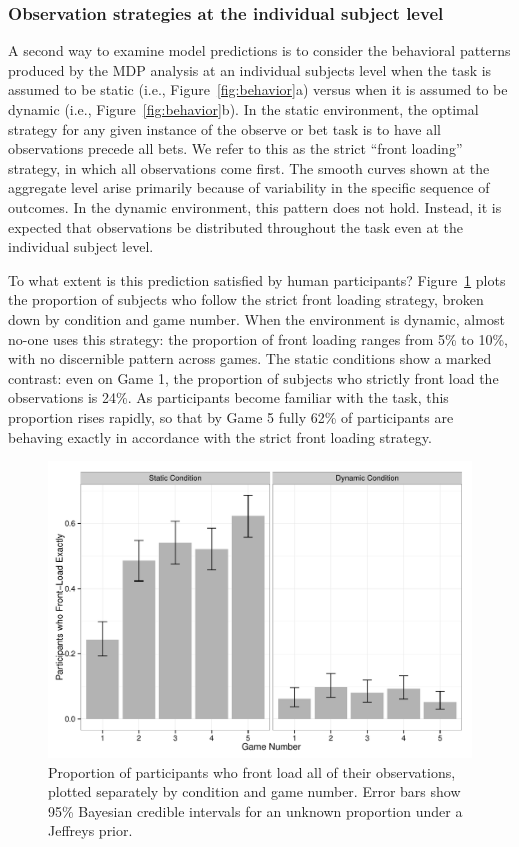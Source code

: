 \documentclass[authoryear]{elsarticle}
\newcommand{\subsubsectionX}[1]{\subsubsection{#1}}
\begin{document}
\subsubsectionX{Observation strategies at the individual subject level}


A second way to examine model predictions is to consider the behavioral patterns produced by the MDP analysis at an individual subjects level when the task is assumed to be static (i.e., Figure~\ref{fig:behavior}a) versus when it is assumed to be dynamic (i.e., Figure~\ref{fig:behavior}b). In the static environment, the optimal strategy for any given instance of the observe or bet task is to have all observations precede all bets. We refer to this as the strict ``front loading'' strategy, in which all observations come first. The smooth curves shown at the aggregate level arise primarily because of variability in the specific sequence of outcomes. In the dynamic environment, this pattern does not hold. Instead, it is expected that observations be distributed throughout the task even at the individual subject level.

To what extent is this prediction satisfied by human participants? Figure~\ref{fig:frontload2} plots the proportion of subjects who follow the strict front loading strategy, broken down by condition and game number. When the environment is dynamic, almost no-one uses this strategy: the proportion of front loading ranges from 5\% to 10\%, with no discernible pattern across games. The static conditions show a marked contrast: even on Game 1, the proportion of subjects who strictly front load the observations is 24\%. As participants become familiar with the task, this proportion rises rapidly, so that by Game 5 fully 62\% of participants are behaving exactly in accordance with the strict front loading strategy.

\begin{figure}[t]
\begin{center}
\includegraphics[scale=.5]{frontLoading2.pdf}
\caption{Proportion of participants who front load all of their observations, plotted separately by condition and game number. Error bars show 95\% Bayesian credible intervals for an unknown proportion under a Jeffreys prior.  }
\label{fig:frontload2}
\end{center}
\end{figure}
\end{document}
